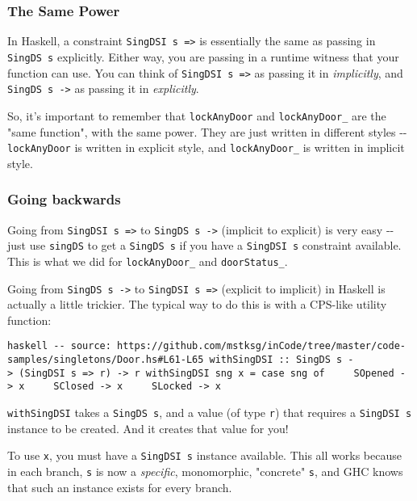 \documentclass[]{article}
\begin{document}
\subsubsection{The Same Power}

In Haskell, a constraint \texttt{SingDSI\ s\ =\textgreater{}} is essentially the
same as passing in \texttt{SingDS\ s} explicitly. Either way, you are passing in
a runtime witness that your function can use. You can think of
\texttt{SingDSI\ s\ =\textgreater{}} as passing it in \emph{implicitly}, and
\texttt{SingDS\ s\ -\textgreater{}} as passing it in \emph{explicitly}.

So, it's important to remember that \texttt{lockAnyDoor} and
\texttt{lockAnyDoor\_} are the "same function", with the same power. They are
just written in different styles -\/- \texttt{lockAnyDoor} is written in
explicit style, and \texttt{lockAnyDoor\_} is written in implicit style.

\subsubsection{Going backwards}

Going from \texttt{SingDSI\ s\ =\textgreater{}} to
\texttt{SingDS\ s\ -\textgreater{}} (implicit to explicit) is very easy -\/-
just use \texttt{singDS} to get a \texttt{SingDS\ s} if you have a
\texttt{SingDSI\ s} constraint available. This is what we did for
\texttt{lockAnyDoor\_} and \texttt{doorStatus\_}.

Going from \texttt{SingDS\ s\ -\textgreater{}} to
\texttt{SingDSI\ s\ =\textgreater{}} (explicit to implicit) in Haskell is
actually a little trickier. The typical way to do this is with a CPS-like
utility function:

\texttt{haskell\ -\/-\ source:\ https://github.com/mstksg/inCode/tree/master/code-samples/singletons/Door.hs\#L61-L65\ withSingDSI\ ::\ SingDS\ s\ -\textgreater{}\ (SingDSI\ s\ =\textgreater{}\ r)\ -\textgreater{}\ r\ withSingDSI\ sng\ x\ =\ case\ sng\ of\ \ \ \ \ SOpened\ -\textgreater{}\ x\ \ \ \ \ SClosed\ -\textgreater{}\ x\ \ \ \ \ SLocked\ -\textgreater{}\ x}

\texttt{withSingDSI} takes a \texttt{SingDS\ s}, and a value (of type
\texttt{r}) that requires a \texttt{SingDSI\ s} instance to be created. And it
creates that value for you!

To use \texttt{x}, you must have a \texttt{SingDSI\ s} instance available. This
all works because in each branch, \texttt{s} is now a \emph{specific},
monomorphic, "concrete" \texttt{s}, and GHC knows that such an instance exists
for every branch.
\end{document}
